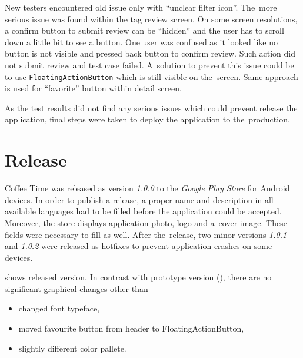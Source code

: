 New testers encountered old issue only with ``unclear filter icon''. The~more serious issue was found within the tag review screen. On some screen resolutions, a confirm button to submit review can be ``hidden'' and the user has to scroll down a little bit to see a button. One user was confused as it looked like no button is not visible and pressed back button to confirm review. Such action did not submit review and test case failed. A~solution to prevent this issue could be to use \verb|FloatingActionButton| which is still visible on the~screen. Same approach is used for ``favorite'' button within detail screen.

As the test results did not find any serious issues which could prevent release the application, final steps were taken to deploy the application to the~production.

\section{Release}
Coffee Time was released as version \textit{1.0.0} to the \textit{Google Play Store} for Android devices. In order to publish a release, a proper name and description in all available languages had to be filled before the application could be accepted. Moreover, the store displays application photo, logo and a~cover image. These fields were necessary to fill as well. After the~release, two minor versions \textit{1.0.1} and \textit{1.0.2} were released as hotfixes to prevent application crashes on some devices.

 shows released version. In contrast with prototype version (), there are no significant graphical changes other than 

\begin{itemize}
    \item changed font typeface,
    \item moved favourite button from header to FloatingActionButton,
    \item slightly different color pallete.
\end{itemize}

